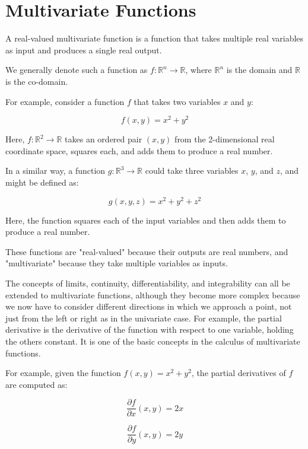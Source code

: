 \chapter{Multivariate Functions}

A real-valued multivariate function is a function that takes multiple real variables as input and produces a single real output.

We generally denote such a function as $f: \mathbb{R}^n \rightarrow \mathbb{R}$, where $\mathbb{R}^n$ is the domain and $\mathbb{R}$ is the co-domain.

For example, consider a function $f$ that takes two variables $x$ and $y$:

\begin{equation*}
f(x, y) = x^2 + y^2
\end{equation*}

Here, $f: \mathbb{R}^2 \rightarrow \mathbb{R}$ takes an ordered pair $(x, y)$ from the 2-dimensional real coordinate space, squares each, and adds them to produce a real number.

In a similar way, a function $g: \mathbb{R}^3 \rightarrow \mathbb{R}$ could take three variables $x$, $y$, and $z$, and might be defined as:

\begin{equation*}
g(x, y,z) = x^2 + y^2 + z^2
\end{equation*}

Here, the function squares each of the input variables and then adds them to produce a real number.

These functions are "real-valued" because their outputs are real numbers, and "multivariate" because they take multiple variables as inputs.

The concepts of limits, continuity, differentiability, and integrability can all be extended to multivariate functions, although they become more complex because we now have to consider different directions in which we approach a point, not just from the left or right as in the univariate case. For example, the partial derivative is the derivative of the function with respect to one variable, holding the others constant. It is one of the basic concepts in the calculus of multivariate functions.

For example, given the function $f(x, y) = x^2 + y^2$, the partial derivatives of $f$ are computed as:

\begin{equation*}
\frac{\partial f}{\partial x}(x, y) = 2x
\end{equation*}

\begin{equation*}
\frac{\partial f}{\partial y}(x, y) = 2y
\end{equation*}

